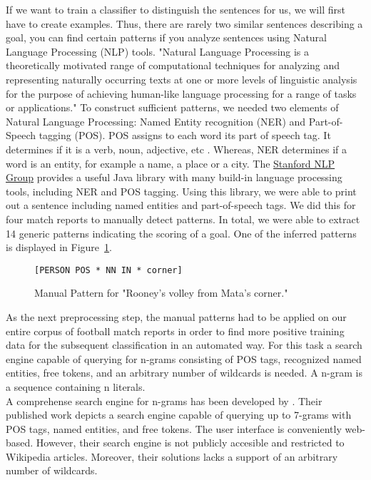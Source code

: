 \documentclass[11pt,titlepage,oneside,openany]{book}
\begin{document}
If we want to train a classifier to distinguish the sentences for us, we will first have to create examples. Thus, there are rarely two similar sentences describing a goal, you can find certain patterns if you analyze sentences using Natural Language Processing (NLP) tools. "Natural Language Processing is a theoretically motivated range of computational techniques for analyzing and representing naturally occurring texts at one or more levels of linguistic analysis for the purpose of achieving human-like language processing for a range of tasks or applications." \citep[p.1]{Liddy2001} To construct sufficient patterns, we needed two elements of Natural Language Processing: Named Entity recognition (NER) and Part-of-Speech tagging (POS). POS assigns to each word its part of speech tag. It determines if it is a verb, noun, adjective, etc \citep[p.219]{Voutilainen2005}. Whereas, NER determines if a word is an entity, for example a name, a place or a city.  
The \hyperlink{http://nlp.stanford.edu/software/CRF-NER.shtml}{Stanford NLP Group} provides a useful Java library with many build-in language processing tools, including NER and POS tagging. Using this library, we were able to print out a sentence including named entities and part-of-speech tags. We did this for four match reports to manually detect patterns. In total, we were able to extract 14 generic patterns indicating the scoring of a goal. One of the inferred patterns is displayed in Figure~\ref{fig.manualpattern}. \\
\begin{figure} [h!]
\centering
\begin{lstlisting}[frame=single]
[PERSON POS * NN IN * corner]
\end{lstlisting}
\caption{Manual Pattern for "Rooney's volley from Mata's corner."}
\label{fig.manualpattern}
\end{figure}

As the next preprocessing step, the manual patterns had to be applied on our entire corpus of football match reports in order to find more positive training data for the subsequent classification in an automated way. For this task a search engine capable of querying for n-grams consisting of POS tags, recognized named entities, free tokens, and an arbitrary number of wildcards is needed. A n-gram is a sequence containing n literals.\\
A comprehense search engine for n-grams has been developed by \citeauthor*{Sekine2010} \citeyearpar{Sekine2010}. Their published work depicts a search engine capable of querying up to 7-grams with POS tags, named entities, and free tokens. The user interface is conveniently web-based. However, their search engine is not publicly accesible and restricted to Wikipedia articles. Moreover,  their solutions lacks a support of an arbitrary number of wildcards.\\
\end{document}

